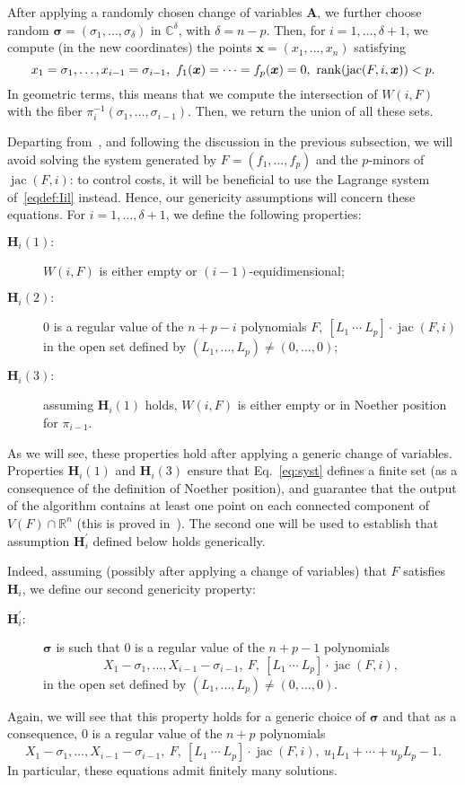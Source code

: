 \documentclass[12pt]{article}
\def\mA{{\bm A}}
\def\xb{{\bm x}}
\DeclareMathOperator{\jac}{jac}
\def\C{\mathbb{C}}
\def\R{\mathbb{R}}
\begin{document}
After applying a randomly chosen change of variables $\mA$, we further
choose random $\bm\sigma=(\sigma_1,\dots,\sigma_{\delta})$ in
$\C^{\delta}$, with $\delta = n -p$. Then, for $i=1,\dots,\delta+1$,
we compute (in the new coordinates) the points $\xb=(x_1,\dots,x_n)$
satisfying
\begin{equation}\label{eq:syst}
x_1 = \sigma_1,\hdots,x_{i-1} = \sigma_{i-1},\ f_1(\xb)=\cdots=f_p(\xb)=0,\ {\rm rank} (\jac(F, i,\xb)) < p.
\end{equation}
In geometric terms, this means that we compute the intersection of
$W(i,F)$ with the fiber $\pi_i^{-1}(\sigma_1,\dots,\sigma_{i-1})$.
Then, we return the union of all these sets.

Departing from~\cite{EMP}, and following the discussion in the
previous subsection, we will avoid solving the system generated by
$F=(f_1,\dots,f_p)$ and the $p$-minors of $\jac(F, i)$: to control
costs, it will be beneficial to use the Lagrange system
of~\eqref{eqdef:Iil} instead. Hence, our genericity assumptions will
concern these equations. For $i=1,\dots,\delta+1$, we define the
following properties:
\begin{description}
\item [$\bm H_i(1):$] $W(i,F)$ is either empty or $(i-1)$-equidimensional;
\item [$\bm H_i(2):$] $0$ is a regular value of the $n+p-i$ polynomials
  $F,\ [L_1~\cdots~L_p]\cdot \jac(F, i)$ in the open set defined by
  $(L_1,\dots,L_p) \ne (0,\dots,0)$;
\item [$\bm H_i(3):$] assuming $\bm H_i(1)$ holds, $W(i,F)$ is either
  empty or in Noether position for $\pi_{i-1}$.
\end{description}
As we will see, these properties hold after applying a generic change
of variables. Properties $\bm H_i(1)$ and $\bm H_i(3)$ ensure that
Eq.~\eqref{eq:syst} defines a finite set (as a consequence of the
definition of Noether position), and guarantee that the output of the
algorithm contains at least one point on each connected component of
$V(F) \cap \R^n$ (this is proved in~\cite[Theorem~2]{EMP}). The second
one will be used to establish that assumption $\bm H^{'}_i$ defined
below holds generically.

Indeed, assuming (possibly after applying a change of variables) that
$F$ satisfies $\bm H_i$, we define our second genericity property:
\begin{description}
\item [$\bm H^{'}_i:$] $\bm \sigma$ is such that $0$ is a regular value of the $n+p-1$
  polynomials
  \[ X_1 - \sigma_1, \dots, X_{i-1} - \sigma_{i-1},\ F,\ [L_1~\cdots~L_p]\cdot \jac(F, i), \]
  in the open set defined by $(L_1,\dots,L_p) \ne (0,\dots,0)$.
\end{description}
Again, we will see that this property holds for a generic choice of
$\bm\sigma$ and that as a consequence, $0$ is a regular value of the
$n+p$ polynomials
\begin{equation}\label{eq:syst2}
  X_1 - \sigma_1, \dots, X_{i-1} - \sigma_{i-1},\ F,\ [L_1~\cdots~L_p]\cdot \jac(F, i),\ u_1 L_1 + \cdots + u_p L_p -1.
\end{equation}
In particular, these equations admit finitely many solutions.
\end{document}
